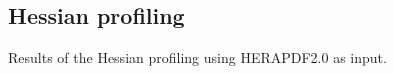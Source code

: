 \subsection{Hessian profiling}
\label{sec:hessianprofiling}

Results of the Hessian profiling using HERAPDF2.0 as input.

